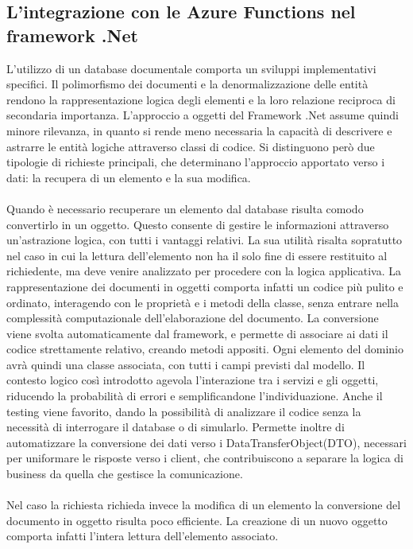 \subsection{L'integrazione con le Azure Functions nel framework .Net}
L'utilizzo di un database documentale comporta un sviluppi implementativi specifici.
Il polimorfismo dei documenti e la denormalizzazione delle entità
rendono la rappresentazione logica degli elementi e la loro relazione reciproca di secondaria importanza.
L'approccio a oggetti del Framework .Net assume quindi minore rilevanza,
in quanto si rende meno necessaria la capacità di descrivere e astrarre
le entità logiche attraverso classi di codice.
Si distinguono però due tipologie di richieste principali,
che determinano l'approccio apportato verso i dati:
la recupera di un elemento e la sua modifica.\\
\\
Quando è necessario recuperare un elemento dal database risulta comodo
convertirlo in un oggetto.
Questo consente di gestire le informazioni attraverso un'astrazione logica, con tutti i vantaggi relativi.
La sua utilità risalta sopratutto nel caso in cui la lettura dell'elemento
non ha il solo fine di essere restituito al richiedente,
ma deve venire analizzato per procedere con la logica applicativa.
La rappresentazione dei documenti in oggetti comporta infatti un codice più pulito e ordinato,
interagendo con le proprietà e i metodi della classe, senza entrare nella complessità computazionale
dell'elaborazione del documento.
La conversione viene svolta automaticamente dal framework,
e permette di associare ai dati il codice strettamente relativo, creando metodi appositi.
Ogni elemento del dominio avrà quindi una classe associata,
con tutti i campi previsti dal modello.
Il contesto logico così introdotto agevola l'interazione tra i servizi e gli oggetti,
riducendo la probabilità di errori e semplificandone l'individuazione.
Anche il testing viene favorito, dando la possibilità di analizzare il codice
senza la necessità di interrogare il database o di simularlo.
Permette inoltre di automatizzare la conversione dei dati verso i DataTransferObject(DTO),
necessari per uniformare le risposte verso i client,
che contribuiscono a separare la logica di business da quella che gestisce la comunicazione.\\
\\
Nel caso la richiesta richieda invece la modifica di un elemento
la conversione del documento in oggetto risulta poco efficiente.
La creazione di un nuovo oggetto comporta infatti l'intera lettura dell'elemento associato.
